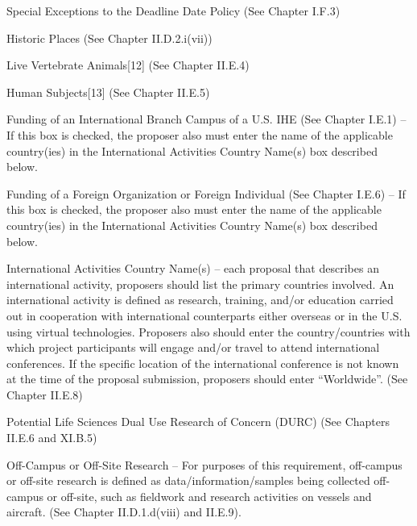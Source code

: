 {Special Exceptions to the Deadline Date Policy (See Chapter I.F.3)

Historic Places (See Chapter II.D.2.i(vii))

Live Vertebrate Animals[12] (See Chapter II.E.4)

Human Subjects[13] (See Chapter II.E.5)

Funding of an International Branch Campus of a U.S. IHE (See Chapter I.E.1) – If this box is checked, the proposer also must enter the name of the applicable country(ies) in the International Activities Country Name(s) box described below.

Funding of a Foreign Organization or Foreign Individual (See Chapter I.E.6) – If this box is checked, the proposer also must enter the name of the applicable country(ies) in the International Activities Country Name(s) box described below.

International Activities Country Name(s) – each proposal that describes an international activity, proposers should list the primary countries involved. An international activity is defined as research, training, and/or education carried out in cooperation with international counterparts either overseas or in the U.S. using virtual technologies. Proposers also should enter the country/countries with which project participants will engage and/or travel to attend international conferences. If the specific location of the international conference is not known at the time of the proposal submission, proposers should enter “Worldwide”. (See Chapter II.E.8)

Potential Life Sciences Dual Use Research of Concern (DURC) (See Chapters II.E.6 and XI.B.5)

Off-Campus or Off-Site Research – For purposes of this requirement, off-campus or off-site research is defined as data/information/samples being collected off-campus or off-site, such as fieldwork and research activities on vessels and aircraft. (See Chapter II.D.1.d(viii) and II.E.9).
}
